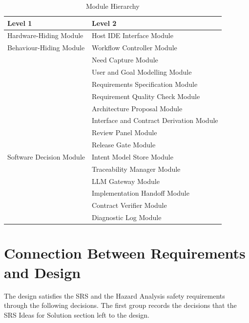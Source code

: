 \documentclass[12pt, titlepage]{article}
\begin{document}
\begin{table}[H]
\centering
\begin{tabular}{p{} p{}}
\toprule
\textbf{Level 1} & \textbf{Level 2}\\
\midrule
Hardware-Hiding Module & Host IDE Interface Module\\
\midrule
Behaviour-Hiding Module & Workflow Controller Module\\
 & Need Capture Module\\
 & User and Goal Modelling Module\\
 & Requirements Specification Module\\
 & Requirement Quality Check Module\\
 & Architecture Proposal Module\\
 & Interface and Contract Derivation Module\\
 & Review Panel Module\\
 & Release Gate Module\\
\midrule
Software Decision Module & Intent Model Store Module\\
 & Traceability Manager Module\\
 & LLM Gateway Module\\
 & Implementation Handoff Module\\
 & Contract Verifier Module\\
 & Diagnostic Log Module\\
\bottomrule
\end{tabular}
\caption{Module Hierarchy}
\label{TblMH}
\end{table}

\section{Connection Between Requirements and Design} \label{SecConnection}

The design satisfies the SRS and the Hazard Analysis safety requirements through
the following decisions. The first group records the decisions that the SRS
Ideas for Solution section left to the design.
\end{document}
